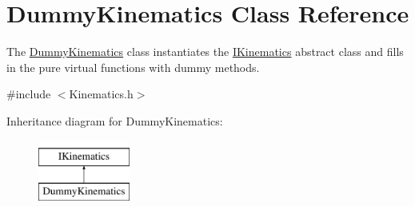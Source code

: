\hypertarget{classDummyKinematics}{\section{Dummy\-Kinematics Class Reference}
\label{classDummyKinematics}
}


The \hyperlink{classDummyKinematics}{Dummy\-Kinematics} class instantiates the \hyperlink{classIKinematics}{I\-Kinematics} abstract class and fills in the pure virtual functions with dummy methods.  




{\ttfamily \#include $<$Kinematics.\-h$>$}

Inheritance diagram for Dummy\-Kinematics\-:\begin{figure}[H]
\begin{center}
\leavevmode
\includegraphics[height=2.000000cm]{classDummyKinematics}
\end{center}
\end{figure}
